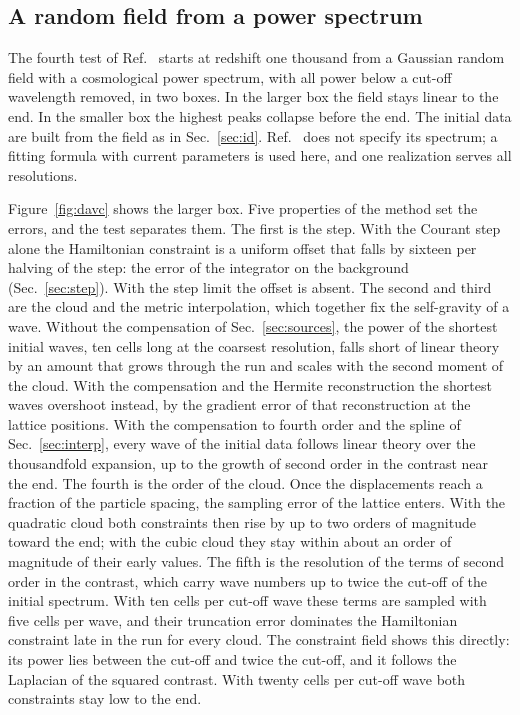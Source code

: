 \documentclass[aps,prd,twocolumn,10pt,superscriptaddress,nofootinbib,longbibliography,floatfix]{revtex4-2}
\begin{document}
\subsection{A random field from a power spectrum}\label{sec:res_field}

The fourth test of Ref.~\cite{Daverio:2019gql} starts at redshift one thousand from a Gaussian random field with a cosmological power spectrum, with all power below a cut-off wavelength removed, in two boxes. In the larger box the field stays linear to the end. In the smaller box the highest peaks collapse before the end. The initial data are built from the field as in Sec.~\ref{sec:id}. Ref.~\cite{Daverio:2019gql} does not specify its spectrum; a fitting formula with current parameters is used here, and one realization serves all resolutions.

Figure~\ref{fig:davc} shows the larger box. Five properties of the method set the errors, and the test separates them. The first is the step. With the Courant step alone the Hamiltonian constraint is a uniform offset that falls by sixteen per halving of the step: the error of the integrator on the background (Sec.~\ref{sec:step}). With the step limit the offset is absent. The second and third are the cloud and the metric interpolation, which together fix the self-gravity of a wave. Without the compensation of Sec.~\ref{sec:sources}, the power of the shortest initial waves, ten cells long at the coarsest resolution, falls short of linear theory by an amount that grows through the run and scales with the second moment of the cloud. With the compensation and the Hermite reconstruction the shortest waves overshoot instead, by the gradient error of that reconstruction at the lattice positions. With the compensation to fourth order and the spline of Sec.~\ref{sec:interp}, every wave of the initial data follows linear theory over the thousandfold expansion, up to the growth of second order in the contrast near the end. The fourth is the order of the cloud. Once the displacements reach a fraction of the particle spacing, the sampling error of the lattice enters. With the quadratic cloud both constraints then rise by up to two orders of magnitude toward the end; with the cubic cloud they stay within about an order of magnitude of their early values. The fifth is the resolution of the terms of second order in the contrast, which carry wave numbers up to twice the cut-off of the initial spectrum. With ten cells per cut-off wave these terms are sampled with five cells per wave, and their truncation error dominates the Hamiltonian constraint late in the run for every cloud. The constraint field shows this directly: its power lies between the cut-off and twice the cut-off, and it follows the Laplacian of the squared contrast. With twenty cells per cut-off wave both constraints stay low to the end.
\end{document}
